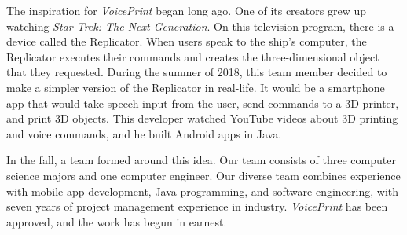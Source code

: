 The inspiration for \textit{VoicePrint} began long ago. One of its creators grew up watching \textit{Star Trek: The Next Generation}. On this television program, there is a device called the Replicator. When users speak to the ship's computer, the Replicator executes their commands and creates the three-dimensional object that they requested. During the summer of 2018, this team member decided to make a simpler version of the Replicator in real-life. It would be a smartphone app that would take speech input from the user, send commands to a 3D printer, and print 3D objects. This developer watched YouTube videos about 3D printing and voice commands, and he built Android apps in Java.

In the fall, a team formed around this idea. Our team consists of three computer science majors and one computer engineer. Our diverse team combines experience with mobile app development, Java programming, and software engineering, with seven years of project management experience in industry. \textit{VoicePrint} has been approved, and the work has begun in earnest.